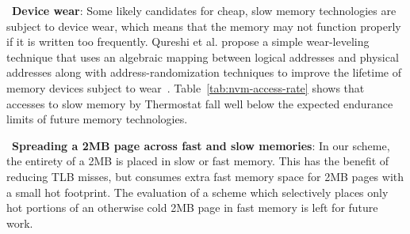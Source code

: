 ~\textbf{Device wear}: Some likely candidates for cheap, slow memory
technologies are subject to device wear, which means that the memory
may not function properly if it is written too frequently. Qureshi et
al. propose a simple wear-leveling technique that uses
an algebraic mapping between logical addresses and physical
addresses along with address-randomization techniques to improve the lifetime of
memory devices subject to wear~\cite{qureshikaridis09}. Table~\ref{tab:nvm-access-rate} shows that
accesses to slow memory by Thermostat fall well below the
expected endurance limits of future memory technologies. 

~\textbf{Spreading a 2MB page across fast and slow memories}: In our scheme, the
entirety of a 2MB is placed in slow or fast memory. This has the benefit of
reducing TLB misses, but consumes extra fast memory space for 2MB pages with a
small hot footprint. The evaluation of a scheme which selectively places only
hot portions of an otherwise cold 2MB page in fast memory is left for future
work.


